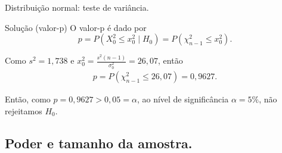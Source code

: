 \documentclass[8pt]{beamer}
\begin{document}
\begin{frame}{Distribuição normal: teste de variância.}

\Large

\begin{block}{Solução (valor-p)}
	O valor-p é dado por 
	$$p=P\left( X_0^2 \leq x_0^2 \mid H_0 \right) = P\left( \chi_{n-1}^2 \leq x_0^2  \right).$$
	
	Como $s^2=1,738$ e $x_0^2= \frac{s^2(n-1)}{\sigma_0^2} = 26,07$, então
	\begin{align*}
		p = P\left( \chi_{n-1}^2 \leq 26,07 \right) = 0,9627.
	\end{align*}
	
	Então, como $p=0,9627 > 0,05 = \alpha$, ao nível de significância $\alpha=5\%$, não rejeitamos $H_0$. 
\end{block}

\normalsize

\end{frame}

\subsection{Poder e tamanho da amostra.}
\end{document}
